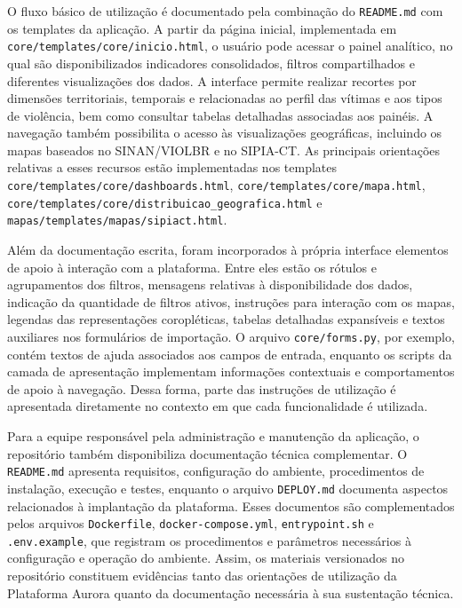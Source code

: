 \documentclass[11pt,a4paper]{article}
\begin{document}
O fluxo básico de utilização é documentado pela combinação do \texttt{README.md} com os templates da aplicação. A partir da página inicial, implementada em \texttt{core/templates/core/inicio.html}, o usuário pode acessar o painel analítico, no qual são disponibilizados indicadores consolidados, filtros compartilhados e diferentes visualizações dos dados. A interface permite realizar recortes por dimensões territoriais, temporais e relacionadas ao perfil das vítimas e aos tipos de violência, bem como consultar tabelas detalhadas associadas aos painéis. A navegação também possibilita o acesso às visualizações geográficas, incluindo os mapas baseados no SINAN/VIOLBR e no SIPIA-CT. As principais orientações relativas a esses recursos estão implementadas nos templates \texttt{core/templates/core/dashboards.html}, \texttt{core/templates/core/mapa.html}, \texttt{core/templates/core/distribuicao\_geografica.html} e \texttt{mapas/templates/mapas/sipiact.html}.

Além da documentação escrita, foram incorporados à própria interface elementos de apoio à interação com a plataforma. Entre eles estão os rótulos e agrupamentos dos filtros, mensagens relativas à disponibilidade dos dados, indicação da quantidade de filtros ativos, instruções para interação com os mapas, legendas das representações coropléticas, tabelas detalhadas expansíveis e textos auxiliares nos formulários de importação. O arquivo \texttt{core/forms.py}, por exemplo, contém textos de ajuda associados aos campos de entrada, enquanto os scripts da camada de apresentação implementam informações contextuais e comportamentos de apoio à navegação. Dessa forma, parte das instruções de utilização é apresentada diretamente no contexto em que cada funcionalidade é utilizada.

Para a equipe responsável pela administração e manutenção da aplicação, o repositório também disponibiliza documentação técnica complementar. O \texttt{README.md} apresenta requisitos, configuração do ambiente, procedimentos de instalação, execução e testes, enquanto o arquivo \texttt{DEPLOY.md} documenta aspectos relacionados à implantação da plataforma. Esses documentos são complementados pelos arquivos \texttt{Dockerfile}, \texttt{docker-compose.yml}, \texttt{entrypoint.sh} e \texttt{.env.example}, que registram os procedimentos e parâmetros necessários à configuração e operação do ambiente. Assim, os materiais versionados no repositório constituem evidências tanto das orientações de utilização da Plataforma Aurora quanto da documentação necessária à sua sustentação técnica.
\end{document}
